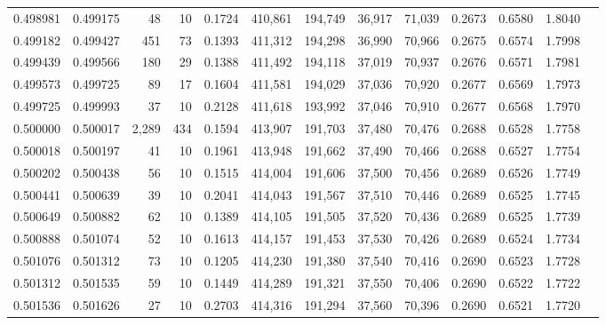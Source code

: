 \begin{tabular}{rrrrrrrrrrrrr}
0.498981 & 0.499175 &    48 &  10 &                                     0.1724 & 410,861 & 194,749 &  36,917 &  71,039 & 0.2673 & 0.6580 & 1.8040 \\
0.499182 & 0.499427 &   451 &  73 &                                     0.1393 & 411,312 & 194,298 &  36,990 &  70,966 & 0.2675 & 0.6574 & 1.7998 \\
0.499439 & 0.499566 &   180 &  29 &                                     0.1388 & 411,492 & 194,118 &  37,019 &  70,937 & 0.2676 & 0.6571 & 1.7981 \\
0.499573 & 0.499725 &    89 &  17 &                                     0.1604 & 411,581 & 194,029 &  37,036 &  70,920 & 0.2677 & 0.6569 & 1.7973 \\
0.499725 & 0.499993 &    37 &  10 &                                     0.2128 & 411,618 & 193,992 &  37,046 &  70,910 & 0.2677 & 0.6568 & 1.7970 \\
0.500000 & 0.500017 & 2,289 & 434 &                                     0.1594 & 413,907 & 191,703 &  37,480 &  70,476 & 0.2688 & 0.6528 & 1.7758 \\
0.500018 & 0.500197 &    41 &  10 &                                     0.1961 & 413,948 & 191,662 &  37,490 &  70,466 & 0.2688 & 0.6527 & 1.7754 \\
0.500202 & 0.500438 &    56 &  10 &                                     0.1515 & 414,004 & 191,606 &  37,500 &  70,456 & 0.2689 & 0.6526 & 1.7749 \\
0.500441 & 0.500639 &    39 &  10 &                                     0.2041 & 414,043 & 191,567 &  37,510 &  70,446 & 0.2689 & 0.6525 & 1.7745 \\
0.500649 & 0.500882 &    62 &  10 &                                     0.1389 & 414,105 & 191,505 &  37,520 &  70,436 & 0.2689 & 0.6525 & 1.7739 \\
0.500888 & 0.501074 &    52 &  10 &                                     0.1613 & 414,157 & 191,453 &  37,530 &  70,426 & 0.2689 & 0.6524 & 1.7734 \\
0.501076 & 0.501312 &    73 &  10 &                                     0.1205 & 414,230 & 191,380 &  37,540 &  70,416 & 0.2690 & 0.6523 & 1.7728 \\
0.501312 & 0.501535 &    59 &  10 &                                     0.1449 & 414,289 & 191,321 &  37,550 &  70,406 & 0.2690 & 0.6522 & 1.7722 \\
0.501536 & 0.501626 &    27 &  10 &                                     0.2703 & 414,316 & 191,294 &  37,560 &  70,396 & 0.2690 & 0.6521 & 1.7720 \\

\end{tabular}
